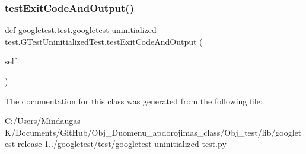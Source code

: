\subsubsection{\texorpdfstring{testExitCodeAndOutput()}{testExitCodeAndOutput()}}
{\footnotesize\ttfamily def googletest.\+test.\+googletest-\/uninitialized-\/test.\+G\+Test\+Uninitialized\+Test.\+test\+Exit\+Code\+And\+Output (\begin{DoxyParamCaption}\item[{}]{self }\end{DoxyParamCaption})}



The documentation for this class was generated from the following file\+:\begin{DoxyCompactItemize}
\item 
C\+:/\+Users/\+Mindaugas K/\+Documents/\+Git\+Hub/\+Obj\+\_\+\+Duomenu\+\_\+apdorojimas\+\_\+class/\+Obj\+\_\+test/lib/googletest-\/release-\/1../googletest/test/\mbox{\hyperlink{_obj__test_2lib_2googletest-release-1_88_81_2googletest_2test_2googletest-uninitialized-test_8py}{googletest-\/uninitialized-\/test.\+py}}\end{DoxyCompactItemize}

